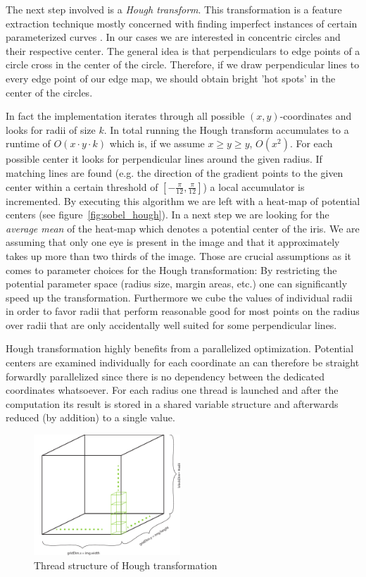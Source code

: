 \documentclass[journal]{IEEEtran}
\begin{document}
The next step involved is a \emph{Hough transform}. This transformation is a feature extraction technique mostly concerned with finding imperfect instances of certain parameterized curves \cite{shapiro2001computer}. In our cases we are interested in concentric circles and their respective center. The general idea is that perpendiculars to edge points of a circle cross in the center of the circle. Therefore, if we draw perpendicular lines to every edge point of our edge map, we should obtain bright 'hot spots' in the center of the circles.
\par In fact the implementation iterates through all possible $(x,y)$-coordinates and looks for radii of size $k$. In total running the Hough transform accumulates to a runtime of $O(x\cdot y \cdot k)$ which is, if we assume $x \geq y \geq y$, $O(x^2)$. For each possible center it looks for perpendicular lines around the given radius. If matching lines are found (e.g. the direction of the gradient points to the given center within a certain threshold of $[-\frac{\pi}{12},\frac{\pi}{12}]$) a local accumulator is incremented. By executing this algorithm we are left with a heat-map of potential centers (see figure~\ref{fig:sobel_hough}). In a next step we are looking for the \emph{average mean} of the heat-map which denotes a potential center of the iris. We are assuming that only one eye is present in the image and that it approximately takes up more than two thirds of the image. Those are crucial assumptions as it comes to parameter choices for the Hough transformation: By restricting the potential parameter space (radius size, margin areas, etc.) one can significantly speed up the transformation.
Furthermore we cube the values of individual radii in order to favor radii that perform reasonable good for most points on the radius over radii that are only accidentally well suited for some perpendicular lines.
\par Hough transformation highly benefits from a parallelized optimization. Potential centers are examined individually for each coordinate an can therefore be straight forwardly parallelized since there is no dependency between the dedicated coordinates whatsoever. For each radius one thread is launched and after the computation its result is stored in a shared variable structure and afterwards reduced (by addition) to a single value.
\begin{figure}[ht]
	\centering
  \includegraphics[width=0.49\textwidth]{iris/hough_impl}
	\caption{Thread structure of Hough transformation}
	\label{fig:hough_impl}
\end{figure}
\end{document}
